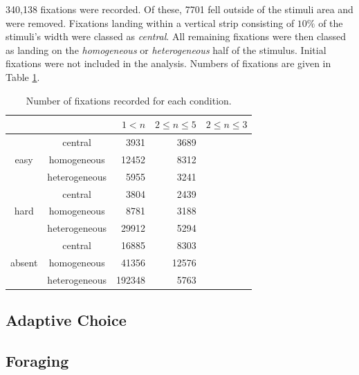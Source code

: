 \documentclass[a4paper, oneside, 11pt, onecolumn]{article}
\begin{document}
340,138 fixations were recorded. Of these, 7701 fell outside of the stimuli area and were removed. Fixations landing within a vertical strip consisting of $10\%$ of the stimuli's width were classed as \textit{central}. All remaining fixations were then classed as landing on the \textit{homogeneous} or \textit{heterogeneous} half of the stimulus. Initial fixations were not included in the analysis. Numbers of fixations are given in Table \ref{tab:num_fix}.

\begin{table}
\centering
\small
\begin{tabular}{c|c|r|r|r}
 		&	& $1<n$	& $2 \leq n \leq 5$ & $2 \leq n \leq 3$\\
\hline
\multirow{3}{*}{easy} 
& central		& 3931 	& 3689	& \\
& homogeneous 	& 12452	& 8312 	&\\
& heterogeneous & 5955	& 3241 	&\\
\hline
\multirow{3}{*}{hard} 
& central		& 3804 	& 2439	& \\
& homogeneous 	& 8781	& 3188	&	\\
& heterogeneous & 29912	& 5294	&\\
\hline
\multirow{3}{*}{absent} 
& central		& 16885 & 8303	& \\
& homogeneous 	& 41356	& 12576	&\\
& heterogeneous & 192348& 5763	&\\
\hline
\end{tabular}
\caption{Number of fixations recorded for each condition.}
\label{tab:num_fix}
\end{table}

\subsection{Adaptive Choice}

\subsection{Foraging}
\end{document}
